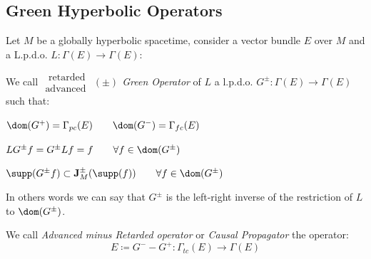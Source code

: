 \documentclass[Main]{subfiles}
\begin{document}
		\subsection{Green Hyperbolic Operators}
			Let $M$ be a globally hyperbolic spacetime, consider a vector bundle $E$ over $M$ and a L.p.d.o. $L: \Gamma(E) \rightarrow \Gamma(E)$:
			\begin{definition}\label{Def:GreenOperators}
				We call \emph{$\substack{\textrm{ retarded}\\ \textrm{advanced } } (\pm)$ Green Operator} of $L$ a
				l.p.d.o. $G^\pm : \Gamma (E) \rightarrow \Gamma(E)$ such that:
				\begin{compactitemize}
					\item $\dom(G^+) = \Gamma_{pc}(E) \qquad \dom(G^-) = \Gamma_{fc}(E)$
					\item $LG^\pm f=G^\pm Lf = f \qquad \forall f\in \dom(G^\pm)$
					\item $\supp(G^\pm f) \subset \mathbf{J}^\pm_M (\supp(f)) \qquad \forall f\in \dom(G^\pm)$
				\end{compactitemize}
			\end{definition}
				In others words we can say that
				$G^\pm$ is the left-right inverse of the restriction of $L$ to $\dom(G^\pm)$.
			\begin{notationfix}

				We call \emph{Advanced minus Retarded operator} or \emph{Causal Propagator}\cite{Benini2013} the operator:
				\begin{displaymath}
					E \coloneqq G^-  - G^+ : \Gamma_{tc}(E) \rightarrow \Gamma(E)
				\end{displaymath}
			\end{notationfix}
\end{document}
